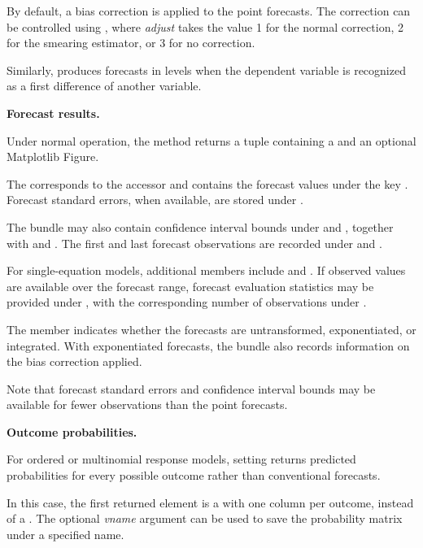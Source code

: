 {	By default, a bias correction is applied to the point
	forecasts. The correction can be controlled using
	, where \textit{adjust}
	takes the value 1 for the normal correction, 2 for
	the smearing estimator, or 3 for no correction.
	
	Similarly,  produces forecasts
	in levels when the dependent variable is recognized as
	a first difference of another variable.
	
	\textbf{Forecast results.}
	
	Under normal operation, the method returns a tuple
	containing a \classpybundle and an optional Matplotlib
	Figure.
	
	The \classpybundle corresponds to the \lgretl
	 accessor and contains the forecast
	values under the key . Forecast
	standard errors, when available, are stored under
	.
	
	The bundle may also contain confidence interval bounds
	under  and , together
	with  and .
	The first and last forecast observations are recorded
	under  and .
	
	For single-equation models, additional members include
	 and . If observed
	values are available over the forecast range, forecast
	evaluation statistics may be provided under
	, with the corresponding number
	of observations under .
	
	The  member indicates whether
	the forecasts are untransformed, exponentiated, or
	integrated. With exponentiated forecasts, the bundle
	also records information on the bias correction applied.
	
	Note that forecast standard errors and confidence
	interval bounds may be available for fewer observations
	than the point forecasts.
	
	\textbf{Outcome probabilities.}
	
	For ordered or multinomial response models, setting
	 returns predicted probabilities
	for every possible outcome rather than conventional
	forecasts.
	
	In this case, the first returned element is a
	\classpymatrix with one column per outcome, instead
	of a \classpybundle. The optional \textit{vname}
	argument can be used to save the probability matrix
	under a specified name.
	
}
